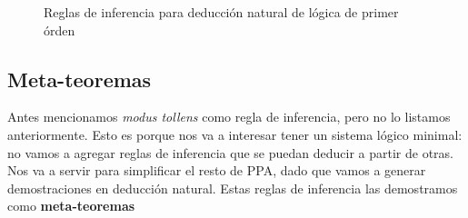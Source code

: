 \begin{figure}[H]
    \begin{multicols}{2}
        \proofTreeFalseE
        \proofTreeTrueI
    \end{multicols}
    
    \begin{multicols}{2}
        \proofTreeLEM
        \proofTreeAx
    \end{multicols}

    \proofSpacing

    \proofTreeAndI

    \begin{multicols}{2}
        \proofTreeAndEOne
        \proofTreeAndETwo
    \end{multicols}

    \proofSpacing

    \begin{multicols}{2}
        \proofTreeOrIOne
        \proofTreeOrITwo
    \end{multicols}
    
    \proofTreeOrE

    \proofSpacing

    \begin{multicols}{2}
        \proofTreeImpI
        \proofTreeImpE
    \end{multicols}
    \begin{multicols}{2}
        \proofTreeNotI
        \proofTreeNotE
    \end{multicols}

    \proofSpacing

    \begin{multicols}{2}
        \proofTreeForallI
        \proofTreeForallE
    \end{multicols}

    \proofSpacing

    \proofTreeExistsI
    \proofTreeExistsE

    \caption{Reglas de inferencia para deducción natural de lógica de primer órden}
    \label{nd:inference-rules}
\end{figure}

\subsection{Meta-teoremas}

Antes mencionamos \textit{modus tollens} como regla de inferencia, pero no lo
listamos anteriormente. Esto es porque nos va a interesar tener un sistema
lógico minimal: no vamos a agregar reglas de inferencia que se puedan deducir a
partir de otras. Nos va a servir para simplificar el resto de PPA, dado que
vamos a generar demostraciones en deducción natural. Estas reglas de inferencia
las demostramos como \textbf{meta-teoremas}

